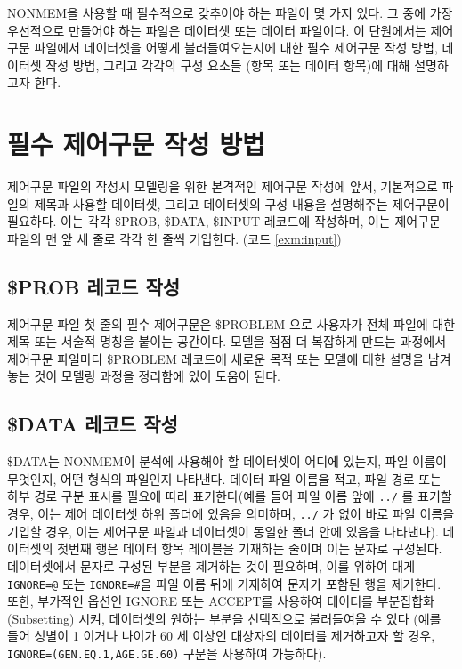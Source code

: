 \documentclass[
  11pt,
  krantz2,
  a4paper]{krantz}
\theoremstyle{definition}
\theoremstyle{definition}
\theoremstyle{definition}
\theoremstyle{remark}
\begin{document}
NONMEM을 사용할 때 필수적으로 갖추어야 하는 파일이 몇 가지 있다. 그 중에 가장 우선적으로 만들어야 하는 파일은 데이터셋 또는 데이터 파일이다. 이 단원에서는 제어구문 파일에서 데이터셋을 어떻게 불러들여오는지에 대한 필수 제어구문 작성 방법, 데이터셋 작성 방법, 그리고 각각의 구성 요소들 (항목 또는 데이터 항목)에 대해 설명하고자 한다.

\hypertarget{uxd544uxc218-uxc81cuxc5b4uxad6cuxbb38-uxc791uxc131-uxbc29uxbc95}{%
\section{필수 제어구문 작성 방법}\label{uxd544uxc218-uxc81cuxc5b4uxad6cuxbb38-uxc791uxc131-uxbc29uxbc95}}

제어구문 파일의 작성시 모델링을 위한 본격적인 제어구문 작성에 앞서, 기본적으로 파일의 제목과 사용할 데이터셋, 그리고 데이터셋의 구성 내용을 설명해주는 제어구문이 필요하다. 이는 각각 \$PROB, \$DATA, \$INPUT 레코드에 작성하며, 이는 제어구문 파일의 맨 앞 세 줄로 각각 한 줄씩 기입한다. (코드 \ref{exm:input})

\hypertarget{prob-uxb808uxcf54uxb4dc-uxc791uxc131}{%
\subsection{\$PROB 레코드 작성}\label{prob-uxb808uxcf54uxb4dc-uxc791uxc131}}

제어구문 파일 첫 줄의 필수 제어구문은 \$PROBLEM 으로 사용자가 전체 파일에 대한 제목 또는 서술적 명칭을 붙이는 공간이다. 모델을 점점 더 복잡하게 만드는 과정에서 제어구문 파일마다 \$PROBLEM 레코드에 새로운 목적 또는 모델에 대한 설명을 남겨놓는 것이 모델링 과정을 정리함에 있어 도움이 된다.

\hypertarget{data-uxb808uxcf54uxb4dc-uxc791uxc131}{%
\subsection{\$DATA 레코드 작성}\label{data-uxb808uxcf54uxb4dc-uxc791uxc131}}


\$DATA는 NONMEM이 분석에 사용해야 할 데이터셋이 어디에 있는지, 파일 이름이 무엇인지, 어떤 형식의 파일인지 나타낸다. 데이터 파일 이름을 적고, 파일 경로 또는 하부 경로 구분 표시를 필요에 따라 표기한다(예를 들어 파일 이름 앞에 \texttt{../} 를 표기할 경우, 이는 제어 데이터셋 하위 폴더에 있음을 의미하며, \texttt{../} 가 없이 바로 파일 이름을 기입할 경우, 이는 제어구문 파일과 데이터셋이 동일한 폴더 안에 있음을 나타낸다). 데이터셋의 첫번째 행은 데이터 항목 레이블을 기재하는 줄이며 이는 문자로 구성된다. 데이터셋에서 문자로 구성된 부분을 제거하는 것이 필요하며, 이를 위하여 대게 \texttt{IGNORE=@} 또는 \texttt{IGNORE=\#}을 파일 이름 뒤에 기재하여 문자가 포함된 행을 제거한다. 또한, 부가적인 옵션인 IGNORE 또는 ACCEPT를 사용하여 데이터를 부분집합화(Subsetting) 시켜, 데이터셋의 원하는 부분을 선택적으로 불러들여올 수 있다 (예를 들어 성별이 1 이거나 나이가 60 세 이상인 대상자의 데이터를 제거하고자 할 경우, \texttt{IGNORE=(GEN.EQ.1,AGE.GE.60)} 구문을 사용하여 가능하다).
\end{document}
